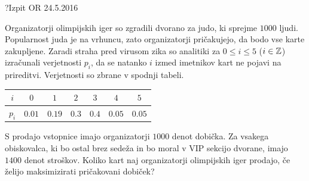 \begin{naloga}{?}{Izpit OR 24.5.2016}
\begin{vprasanje}
Organizatorji olimpijskih iger so zgradili dvorano za judo,
ki sprejme $1000$ ljudi.
Popularnost juda je na vrhuncu,
zato organizatorji pričakujejo, da bodo vse karte zakupljene.
Zaradi straha pred virusom zika so analitiki
za $0 \le i \le 5$ ($i \in \mathbb{Z}$) izračunali verjetnosti $p_i$,
da se natanko $i$ izmed imetnikov kart ne pojavi na prireditvi.
Verjetnosti so zbrane v spodnji tabeli.
\begin{center}
\begin{tabular}{c|cccccc}
$i$   & $0$    & $1$    & $2$   & $3$   & $4$    & $5$ \\ \hline
$p_i$ & $0.01$ & $0.19$ & $0.3$ & $0.4$ & $0.05$ & $0.05$
\end{tabular}
\end{center}

S prodajo vstopnice imajo organizatorji $1000$ denot dobička.
Za vsakega obiskovalca,
ki bo ostal brez sedeža in bo moral v VIP sekcijo dvorane,
imajo $1400$ denot stroškov.
Koliko kart naj organizatorji olimpijskih iger prodajo,
če želijo maksimizirati pričakovani dobiček?
\end{vprasanje}
\begin{odgovor}
\end{odgovor}
\end{naloga}
